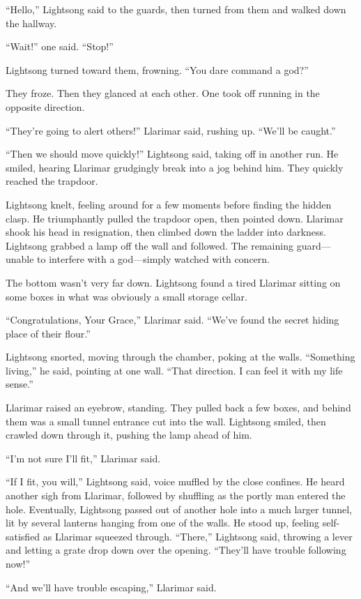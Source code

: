 “Hello,” Lightsong said to the guards, then turned from them and walked down the hallway.

“Wait!” one said. “Stop!”

Lightsong turned toward them, frowning. “You dare command a god?”

They froze. Then they glanced at each other. One took off running in the opposite direction.

“They’re going to alert others!” Llarimar said, rushing up. “We’ll be caught.”

“Then we should move quickly!” Lightsong said, taking off in another run. He smiled, hearing Llarimar grudgingly break into a jog behind him. They quickly reached the trapdoor.

Lightsong knelt, feeling around for a few moments before finding the hidden clasp. He triumphantly pulled the trapdoor open, then pointed down. Llarimar shook his head in resignation, then climbed down the ladder into darkness. Lightsong grabbed a lamp off the wall and followed. The remaining guard—unable to interfere with a god—simply watched with concern.

The bottom wasn’t very far down. Lightsong found a tired Llarimar sitting on some boxes in what was obviously a small storage cellar.

“Congratulations, Your Grace,” Llarimar said. “We’ve found the secret hiding place of their flour.”

Lightsong snorted, moving through the chamber, poking at the walls. “Something living,” he said, pointing at one wall. “That direction. I can feel it with my life sense.”

Llarimar raised an eyebrow, standing. They pulled back a few boxes, and behind them was a small tunnel entrance cut into the wall. Lightsong smiled, then crawled down through it, pushing the lamp ahead of him.

“I’m not sure I’ll fit,” Llarimar said.

“If I fit, you will,” Lightsong said, voice muffled by the close confines. He heard another sigh from Llarimar, followed by shuffling as the portly man entered the hole. Eventually, Lightsong passed out of another hole into a much larger tunnel, lit by several lanterns hanging from one of the walls. He stood up, feeling self-satisfied as Llarimar squeezed through. “There,” Lightsong said, throwing a lever and letting a grate drop down over the opening. “They’ll have trouble following now!”

“And we’ll have trouble escaping,” Llarimar said.

